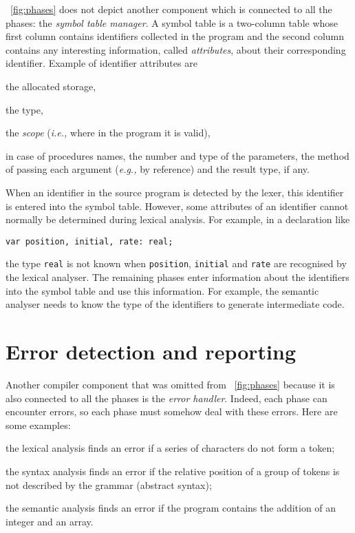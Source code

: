 \Fig~\vref{fig:phases} does not depict another component which is
connected to all the phases: the \emph{symbol table manager}. A symbol
table is a two\hyp{}column table whose first column contains
identifiers collected in the program and the second column contains
any interesting information, called \emph{attributes}, about their
corresponding identifier. Example of identifier attributes are
\begin{itemize*}
  \item the allocated storage,

  \item the type,

  \item the \emph{scope} (\emph{i.e.,} where in the program it is
    valid),

  \item in case of procedures names, the number and type of the
    parameters, the method of passing each argument (\emph{e.g.,} by
    reference) and the result type, if any.

\end{itemize*}
When an identifier in the source program is detected by the lexer,
this identifier is entered into the symbol table. However, some
attributes of an identifier cannot normally be determined during
lexical analysis. For example, in a \Pascal declaration like
\begin{verbatim}
var position, initial, rate: real;
\end{verbatim}
the type \texttt{real} is not known when \texttt{position},
\texttt{initial} and \texttt{rate} are recognised by the lexical
analyser. The remaining phases enter information about the identifiers
into the symbol table and use this information. For example, the
semantic analyser needs to know the type of the identifiers to
generate intermediate code.

\section*{Error detection and reporting}

Another compiler component that was omitted
from \fig~\vref{fig:phases} because it is also connected to all the
phases is the \emph{error handler}. Indeed, each phase can encounter
errors, so each phase must somehow deal with these errors. Here are
some examples:
\begin{itemize*}

  \item the lexical analysis finds an error if a series of characters
  do not form a token;

  \item the syntax analysis finds an error if the relative position of
  a group of tokens is not described by the grammar (abstract syntax);

  \item the semantic analysis finds an error if the program contains
  the addition of an integer and an array.

\end{itemize*}

